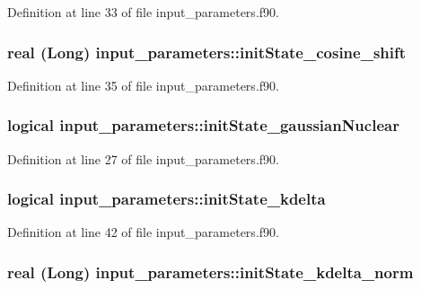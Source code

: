 Definition at line 33 of file input\_\-parameters.f90.

\hypertarget{namespaceinput__parameters_ac3a5530df841dc82b4819f34f1e44980}{
\subsubsection[{initState\_\-cosine\_\-shift}]{\setlength{\rightskip}{0pt plus 5cm}real (Long) {\bf input\_\-parameters::initState\_\-cosine\_\-shift}}}
\label{namespaceinput__parameters_ac3a5530df841dc82b4819f34f1e44980}


Definition at line 35 of file input\_\-parameters.f90.

\hypertarget{namespaceinput__parameters_add8bfc502078fcdca67fff41e00114f7}{
\subsubsection[{initState\_\-gaussianNuclear}]{\setlength{\rightskip}{0pt plus 5cm}logical {\bf input\_\-parameters::initState\_\-gaussianNuclear}}}
\label{namespaceinput__parameters_add8bfc502078fcdca67fff41e00114f7}


Definition at line 27 of file input\_\-parameters.f90.

\hypertarget{namespaceinput__parameters_aae45dd03716b9ad9a0600a9d9a798935}{
\subsubsection[{initState\_\-kdelta}]{\setlength{\rightskip}{0pt plus 5cm}logical {\bf input\_\-parameters::initState\_\-kdelta}}}
\label{namespaceinput__parameters_aae45dd03716b9ad9a0600a9d9a798935}


Definition at line 42 of file input\_\-parameters.f90.

\hypertarget{namespaceinput__parameters_a1b2e5c088ab1d39d896586d7fb18b142}{
\subsubsection[{initState\_\-kdelta\_\-norm}]{\setlength{\rightskip}{0pt plus 5cm}real (Long) {\bf input\_\-parameters::initState\_\-kdelta\_\-norm}}}
\label{namespaceinput__parameters_a1b2e5c088ab1d39d896586d7fb18b142}


